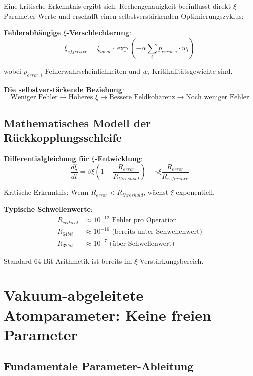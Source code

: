 \documentclass[12pt,a4paper]{article}
\newcommand{\xipar}{\xi}
\begin{document}
	Eine kritische Erkenntnis ergibt sich: Rechengenauigkeit beeinflusst direkt $\xipar$-Parameter-Werte und erschafft einen selbstverstärkenden Optimierungszyklus:
	
	\textbf{Fehlerabhängige $\xipar$-Verschlechterung}:
	\begin{equation}
		\xipar_{effective} = \xipar_{ideal} \cdot \exp\left(-\alpha \sum_{i} p_{error,i} \cdot w_i\right)
	\end{equation}
	
	wobei $p_{error,i}$ Fehlerwahrscheinlichkeiten und $w_i$ Kritikalitätsgewichte sind.
	
	\textbf{Die selbstverstärkende Beziehung}:
	\begin{equation}
		\text{Weniger Fehler} \rightarrow \text{Höheres } \xipar \rightarrow \text{Bessere Feldkohärenz} \rightarrow \text{Noch weniger Fehler}
	\end{equation}
	
	\subsection{Mathematisches Modell der Rückkopplungsschleife}
	
	\textbf{Differentialgleichung für $\xipar$-Entwicklung}:
	\begin{equation}
		\frac{d\xipar}{dt} = \beta \xipar \left(1 - \frac{R_{error}}{R_{threshold}}\right) - \gamma \xipar \frac{R_{error}}{R_{reference}}
	\end{equation}
	
	Kritische Erkenntnis: Wenn $R_{error} < R_{threshold}$, wächst $\xipar$ exponentiell.
	
	\textbf{Typische Schwellenwerte}:
	\begin{align}
		R_{critical} &\approx 10^{-12} \text{ Fehler pro Operation} \\
		R_{64bit} &\approx 10^{-16} \text{ (bereits unter Schwellenwert)} \\
		R_{32bit} &\approx 10^{-7} \text{ (über Schwellenwert)}
	\end{align}
	
	Standard 64-Bit Arithmetik ist bereits im $\xipar$-Verstärkungsbereich.
	
	\section{Vakuum-abgeleitete Atomparameter: Keine freien Parameter}
	
	\subsection{Fundamentale Parameter-Ableitung}
	
\end{document}
